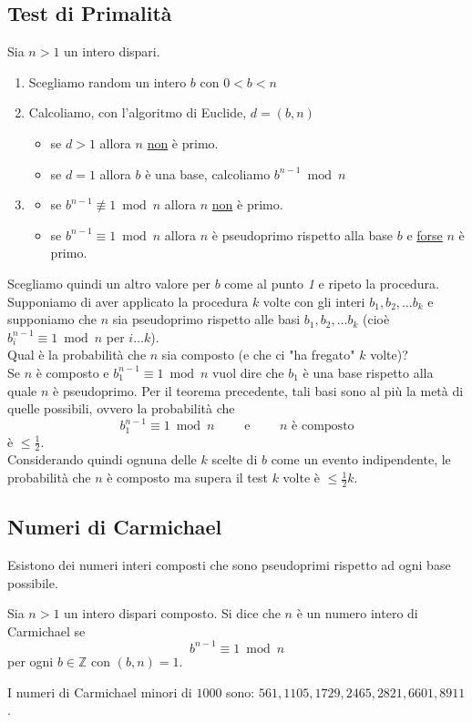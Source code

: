 \documentclass[a4paper,12pt, oneside]{book}
\begin{document}
		\subsection{Test di Primalità}
			Sia $n>1$ un intero dispari.
			\begin{enumerate}
				\item Scegliamo random un intero $b$ con $0 < b < n$
				\item Calcoliamo, con l'algoritmo di Euclide, $d=(b,n)$
					\begin{itemize}
						\item se $d>1$ allora $n$ \underline{non} è primo.
						\item se $d=1$ allora $b$ è una base, calcoliamo $b^{n-1} \bmod n$
					\end{itemize}
				\item \begin{itemize}
					\item se $b^{n-1} \not\equiv 1 \bmod n$ allora $n$ \underline{non} è primo.
					\item se $b^{n-1} \equiv 1 \bmod n$ allora $n$ è pseudoprimo rispetto alla base $b$ e \underline{forse} $n$ è primo.
				\end{itemize}
			\end{enumerate}
			Scegliamo quindi un altro valore per $b$ come al punto \textit{1} e ripeto la procedura.\\
			
			Supponiamo di aver applicato la procedura $k$ volte con gli interi $b_1, b_2, \dots b_k$ e supponiamo che $n$ sia pseudoprimo rispetto alle basi $b_1, b_2, \dots b_k$ (cioè $b_i^{n-1} \equiv 1 \bmod n$ per $i \dots k$).\\
			
			Qual è la probabilità che $n$ sia composto (e che ci "ha fregato" $k$ volte)?\\
			Se $n$ è composto e $b_1^{n-1} \equiv 1 \bmod n$ vuol dire che $b_1$ è una base rispetto alla quale $n$ è pseudoprimo.
			Per il teorema precedente, tali basi sono al più la metà di quelle possibili, ovvero la probabilità che
			$$b_1^{n-1} \equiv 1 \bmod n \qquad \mbox{ e } \qquad n \mbox{ è composto}$$ è $\leq \frac{1}{2}$.\\
			Considerando quindi ognuna delle $k$ scelte di $b$ come un evento indipendente, le probabilità che $n$ è composto ma supera il test $k$ volte è $\leq \frac{1}{2} k$.
			
		\subsection{Numeri di Carmichael}
			Esistono dei numeri interi composti che sono pseudoprimi rispetto ad ogni base possibile.
			\begin{definizione}
				Sia $n > 1$ un intero dispari composto.
				Si dice che $n$ è un numero intero di Carmichael se 
				$$b^{n-1} \equiv 1 \bmod n$$
				per ogni $b \in \mathbb{Z}$ con $(b,n)=1$.
			\end{definizione}
			\begin{nota}
				I numeri di Carmichael minori di $1000$ sono: $561, 1105, 1729, 2465, 2821, 6601, 8911$.
			\end{nota}
			
\end{document}
